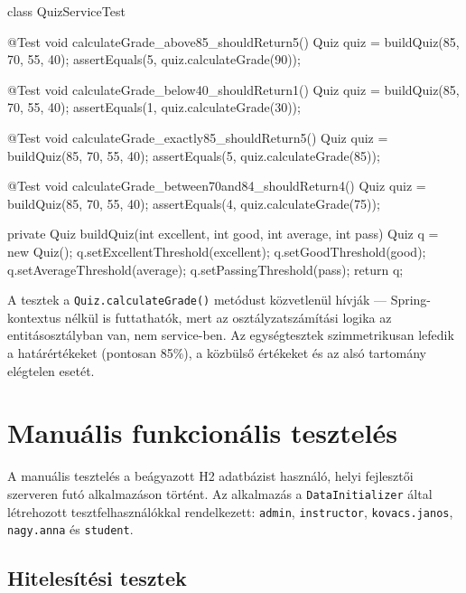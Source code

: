 \begin{java}[caption={Kvíz pontszámítás és osztályzatkiosztás egységtesztje},label=java:quiztest]
class QuizServiceTest {

    @Test
    void calculateGrade_above85_shouldReturn5() {
        Quiz quiz = buildQuiz(85, 70, 55, 40);
        assertEquals(5, quiz.calculateGrade(90));
    }

    @Test
    void calculateGrade_below40_shouldReturn1() {
        Quiz quiz = buildQuiz(85, 70, 55, 40);
        assertEquals(1, quiz.calculateGrade(30));
    }

    @Test
    void calculateGrade_exactly85_shouldReturn5() {
        Quiz quiz = buildQuiz(85, 70, 55, 40);
        assertEquals(5, quiz.calculateGrade(85));
    }

    @Test
    void calculateGrade_between70and84_shouldReturn4() {
        Quiz quiz = buildQuiz(85, 70, 55, 40);
        assertEquals(4, quiz.calculateGrade(75));
    }

    private Quiz buildQuiz(int excellent, int good,
                            int average, int pass) {
        Quiz q = new Quiz();
        q.setExcellentThreshold(excellent);
        q.setGoodThreshold(good);
        q.setAverageThreshold(average);
        q.setPassingThreshold(pass);
        return q;
    }
}
\end{java}

A tesztek a \texttt{Quiz.calculateGrade()} metódust közvetlenül hívják — Spring-kontextus nélkül is futtathatók, mert az osztályzatszámítási logika az entitásosztályban van, nem service-ben. Az egységtesztek szimmetrikusan lefedik a határértékeket (pontosan 85\%), a közbülső értékeket és az alsó tartomány elégtelen esetét.

\section{Manuális funkcionális tesztelés}

A manuális tesztelés a beágyazott H2 adatbázist használó, helyi fejlesztői szerveren futó alkalmazáson történt. Az alkalmazás a \texttt{DataInitializer} által létrehozott tesztfelhasználókkal rendelkezett: \texttt{admin}, \texttt{instructor}, \texttt{kovacs.janos}, \texttt{nagy.anna} és \texttt{student}.

\subsection{Hitelesítési tesztek}

